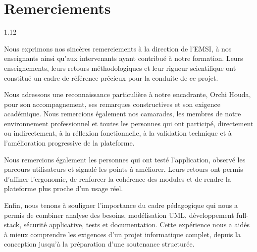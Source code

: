 ﻿\documentclass[12pt,a4paper,oneside]{report}
\newcommand{\supervisorname}{Orchi Houda}
\newcommand{\frontmatterchapter}[1]{
  \chapter*{#1}
  \addcontentsline{toc}{chapter}{#1}
}
\newenvironment{frontmattertext}{
  \begin{spacing}{1.12}
  \normalsize
  \setlength{\parskip}{0.45em}
}{
  \end{spacing}
}
\begin{document}
\frontmatterchapter{Remerciements}
\begin{frontmattertext}
Nous exprimons nos sincères remerciements à la direction de l'EMSI, à nos enseignants ainsi qu'aux intervenants ayant contribué à notre formation. Leurs enseignements, leurs retours méthodologiques et leur rigueur scientifique ont constitué un cadre de référence précieux pour la conduite de ce projet.

Nous adressons une reconnaissance particulière à notre encadrante, \supervisorname, pour son accompagnement, ses remarques constructives et son exigence académique. Nous remercions également nos camarades, les membres de notre environnement professionnel et toutes les personnes qui ont participé, directement ou indirectement, à la réflexion fonctionnelle, à la validation technique et à l'amélioration progressive de la plateforme.

Nous remercions également les personnes qui ont testé l'application, observé les parcours utilisateurs et signalé les points à améliorer. Leurs retours ont permis d'affiner l'ergonomie, de renforcer la cohérence des modules et de rendre la plateforme plus proche d'un usage réel.

Enfin, nous tenons à souligner l'importance du cadre pédagogique qui nous a permis de combiner analyse des besoins, modélisation UML, développement full-stack, sécurité applicative, tests et documentation. Cette expérience nous a aidés à mieux comprendre les exigences d'un projet informatique complet, depuis la conception jusqu'à la préparation d'une soutenance structurée.
\end{frontmattertext}
\end{document}
